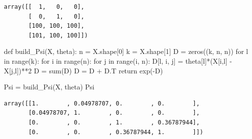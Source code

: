 \documentclass[
  letterpaper,
  DIV=11,
  numbers=noendperiod]{scrreprt}
\newenvironment{Shaded}{\begin{snugshade}}{\end{snugshade}}
\newcommand{\BuiltInTok}[1]{\textcolor[rgb]{0.00,0.23,0.31}{#1}}
\newcommand{\ControlFlowTok}[1]{\textcolor[rgb]{0.00,0.23,0.31}{#1}}
\newcommand{\DecValTok}[1]{\textcolor[rgb]{0.68,0.00,0.00}{#1}}
\newcommand{\KeywordTok}[1]{\textcolor[rgb]{0.00,0.23,0.31}{#1}}
\newcommand{\NormalTok}[1]{\textcolor[rgb]{0.00,0.23,0.31}{#1}}
\newcommand{\OperatorTok}[1]{\textcolor[rgb]{0.37,0.37,0.37}{#1}}
\begin{document}
\begin{tcolorbox}
\begin{verbatim}
array([[  1,   0,   0],
       [  0,   1,   0],
       [100, 100, 100],
       [101, 100, 100]])
\end{verbatim}

\begin{Shaded}
\begin{Highlighting}[]
\KeywordTok{def}\NormalTok{ build\_Psi(X, theta):}
\NormalTok{    n }\OperatorTok{=}\NormalTok{ X.shape[}\DecValTok{0}\NormalTok{]}
\NormalTok{    k }\OperatorTok{=}\NormalTok{ X.shape[}\DecValTok{1}\NormalTok{]}
\NormalTok{    D }\OperatorTok{=}\NormalTok{ zeros((k, n, n))}
    \ControlFlowTok{for}\NormalTok{ l }\KeywordTok{in} \BuiltInTok{range}\NormalTok{(k):}
        \ControlFlowTok{for}\NormalTok{ i }\KeywordTok{in} \BuiltInTok{range}\NormalTok{(n):}
            \ControlFlowTok{for}\NormalTok{ j }\KeywordTok{in} \BuiltInTok{range}\NormalTok{(i, n):}
\NormalTok{                D[l, i, j] }\OperatorTok{=}\NormalTok{ theta[l]}\OperatorTok{*}\NormalTok{(X[i,l] }\OperatorTok{{-}}\NormalTok{ X[j,l])}\OperatorTok{**}\DecValTok{2}
\NormalTok{    D }\OperatorTok{=} \BuiltInTok{sum}\NormalTok{(D)}
\NormalTok{    D }\OperatorTok{=}\NormalTok{ D }\OperatorTok{+}\NormalTok{ D.T}
    \ControlFlowTok{return}\NormalTok{ exp(}\OperatorTok{{-}}\NormalTok{D)  }
\end{Highlighting}
\end{Shaded}

\begin{Shaded}
\begin{Highlighting}[]
\NormalTok{Psi }\OperatorTok{=}\NormalTok{ build\_Psi(X, theta)}
\NormalTok{Psi}
\end{Highlighting}
\end{Shaded}

\begin{verbatim}
array([[1.        , 0.04978707, 0.        , 0.        ],
       [0.04978707, 1.        , 0.        , 0.        ],
       [0.        , 0.        , 1.        , 0.36787944],
       [0.        , 0.        , 0.36787944, 1.        ]])
\end{verbatim}

\end{tcolorbox}
\end{document}

